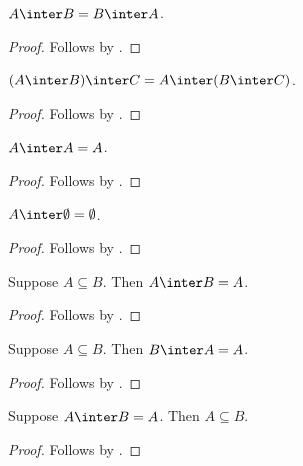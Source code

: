 \begin{proposition}%
\label{inter_comm}
    $A\inter B = B\inter A$.
\end{proposition}
\begin{proof}
    Follows by .
\end{proof}

\begin{proposition}%
\label{inter_assoc}
    $(A\inter B)\inter C = A\inter (B\inter C)$.
\end{proposition}
\begin{proof}
    Follows by .
\end{proof}

\begin{proposition}%
\label{inter_idempotent}
    $A\inter A = A$.
\end{proposition}
\begin{proof}
    Follows by .
\end{proof}

\begin{proposition}\label{inter_emptyset}
    $A\inter\emptyset = \emptyset$.
\end{proposition}
\begin{proof}
    Follows by .
\end{proof}

\begin{proposition}%
\label{inter_absorb_supseteq_right}
    Suppose $A\subseteq B$. Then $A\inter B = A$.
\end{proposition}
\begin{proof}
    Follows by .
\end{proof}

\begin{proposition}%
\label{inter_absorb_supseteq_left}
    Suppose $A\subseteq B$. Then $B\inter A = A$.
\end{proposition}
\begin{proof}
    Follows by .
\end{proof}

\begin{proposition}%
\label{inter_eq_left_implies_subseteq}
    Suppose $A\inter B = A$. Then $A\subseteq B$.
\end{proposition}
\begin{proof}
    Follows by .
\end{proof}

